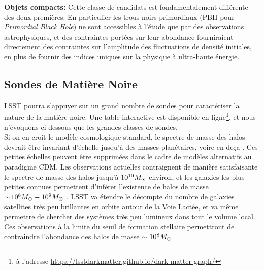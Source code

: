 \documentclass[12pt]{article}
\begin{document}
\noindent \textbf{Objets compacts:} Cette classe de candidats est fondamentalement différente des deux premières. En particulier les trous noirs primordiaux (PBH pour {\it Primordial Black Hole}) ne sont accessibles à l'étude que par des observations astrophysiques, et des contraintes portées sur leur abondance fourniraient directement des contraintes sur l'amplitude des fluctuations de densité initiales, en plus de fournir des indices uniques sur la physique à ultra-haute énergie.


\vspace{-1em} \subsection*{Sondes de Matière Noire} \vspace{-0.5em}
LSST pourra s'appuyer sur un grand nombre de sondes pour caractériser la nature de la matière noire. Une table interactive est disponible en ligne\footnote{à l'adresse \href{https://lsstdarkmatter.github.io/dark-matter-graph/}{https://lsstdarkmatter.github.io/dark-matter-graph/}}, et nous n'évoquons ci-dessous que les grandes classes de sondes.\\
Si on en croit le modèle cosmologique standard, le spectre de masse des halos devrait être invariant d'échelle jusqu'à des masses planétaires, voire en deça \citep[par exemple]{Green:2003un,2005Natur.433..389D,1412.5930}. Ces petites échelles peuvent être supprimées dans le cadre de modèles alternatifs au paradigme CDM.
Les observations actuelles contraignent de manière satisfaisante le spectre de masse des halos jusqu'à $10^{10}M_\odot$ environ, et les galaxies les plus petites connues permettent d'inférer l'existence de halos de masse $ {\sim}\, 10^8 M_\odot - 10^9 M_\odot$ \citep{2017MNRAS.467.2019R,behroozi2018,Jethwa:2018,Kim:2017iwr,Nadler:2018,1807.07093}. 
LSST va étendre le décompte du nombre de galaxies satellites très peu brillantes en orbite autour de la Voie Lactée, et va même permettre de chercher des systèmes très peu lumineux dans tout le volume local. Ces observations à la limite du seuil de formation stellaire permettront de contraindre l'abondance des halos de masse $\sim10^8 M_\odot$.
\end{document}
